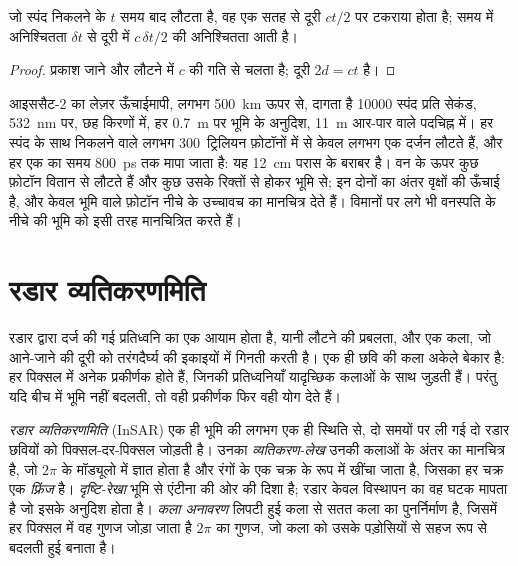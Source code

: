 \begin{proposition}[उड़ान-काल]\label{prop:b3:remote-sensing-gis:tof}
जो स्पंद निकलने के $t$ समय बाद लौटता है, वह एक सतह से
दूरी $ct/2$ पर टकराया होता है; समय में अनिश्चितता $\delta t$ से
दूरी में $c\,\delta t/2$ की अनिश्चितता आती है।
\end{proposition}

\begin{proof}
प्रकाश जाने और लौटने में $c$ की गति से चलता है; दूरी $2d = ct$ है।
\end{proof}

आइससैट-2 का लेज़र ऊँचाईमापी, लगभग \qty{500}{km} ऊपर से, दागता है
\num{10000} स्पंद प्रति सेकंड, \qty{532}{nm} पर, छह किरणों में, हर
\qty{0.7}{m} पर भूमि के अनुदिश, \qty{11}{m} आर-पार वाले पदचिह्न में। हर स्पंद के साथ निकलने वाले
लगभग 300~ट्रिलियन फ़ोटॉनों में से केवल लगभग एक दर्जन लौटते हैं, और
हर एक का समय \qty{800}{ps} तक मापा जाता है: यह \qty{12}{cm} परास के बराबर है।
वन के ऊपर कुछ फ़ोटॉन वितान से लौटते हैं और कुछ उसके रिक्तों से होकर
भूमि से; इन दोनों का अंतर वृक्षों की ऊँचाई है, और केवल भूमि वाले
फ़ोटॉन नीचे के उच्चावच का मानचित्र देते हैं। विमानों पर लगे
 भी वनस्पति के नीचे की भूमि को इसी तरह मानचित्रित करते हैं।

\section{रडार व्यतिकरणमिति}\label{sec:b3:remote-sensing-gis:insar}

रडार द्वारा दर्ज की गई प्रतिध्वनि का एक आयाम होता है, यानी लौटने की प्रबलता,
और एक कला, जो आने-जाने की दूरी को तरंगदैर्घ्य की इकाइयों में
गिनती करती है। एक ही छवि की कला अकेले बेकार है: हर पिक्सल में
अनेक प्रकीर्णक होते हैं, जिनकी प्रतिध्वनियाँ यादृच्छिक कलाओं के साथ जुड़ती हैं। परंतु यदि बीच में भूमि
नहीं बदलती, तो वही प्रकीर्णक फिर वही योग देते हैं।

\begin{definition}\label{def:b3:remote-sensing-gis:insar}
\emph{रडार व्यतिकरणमिति} (InSAR) एक ही भूमि की
लगभग एक ही स्थिति से, दो समयों पर ली गई दो रडार छवियों को पिक्सल-दर-पिक्सल
जोड़ती है। उनका \emph{व्यतिकरण-लेख} उनकी कलाओं के अंतर का मानचित्र है,
जो $2\pi$ के मॉड्यूलो में ज्ञात होता है और
रंगों के एक चक्र के रूप में खींचा जाता है, जिसका हर चक्र एक \emph{फ़्रिंज} है।
\emph{दृष्टि-रेखा} भूमि से एंटीना की ओर की दिशा है;
रडार केवल विस्थापन का वह घटक मापता है जो
इसके अनुदिश होता है। \emph{कला अनावरण} लिपटी हुई कला से सतत कला का
पुनर्निर्माण है, जिसमें हर पिक्सल में वह गुणज जोड़ा जाता है
$2\pi$ का गुणज, जो कला को उसके पड़ोसियों से सहज रूप से बदलती हुई बनाता है।
\end{definition}

